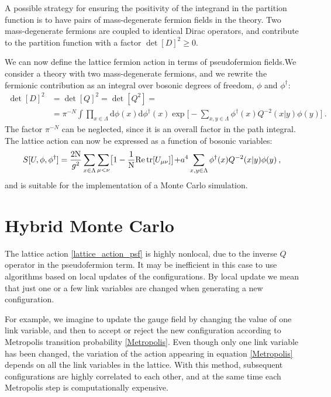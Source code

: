 A possible strategy for ensuring the positivity of the integrand in the partition function is to have pairs of mass-degenerate fermion fields in the theory. Two mass-degenerate fermions are coupled to identical Dirac operators, and contribute to the partition function with a factor $\det[D]^2 \geq 0$. 

We can now define the lattice fermion action in terms of pseudofermion fields.We consider a theory with two mass-degenerate fermions, and we rewrite the fermionic contribution as an integral over bosonic degrees of freedom, $\phi$ and $\phi^{\dagger}$:
\begin{equation}
\begin{split}
\det[D]^2 &= \det[Q]^2 = \det[Q^2] = \\
&=\pi^{-N} \int \prod_{x \in \Lambda} \mathrm{d} \phi(x) \mathrm{d} \phi^{\dagger}(x) \exp \biggl[ 
-\sum_{x,y \in \Lambda} \phi^{\dagger}(x) Q^{-2} (x \vert y) \phi(y) \biggr] \: .
\end{split}
\end{equation}
%
The factor $\pi^{-N}$ can be neglected, since it is an overall factor in the path integral. The lattice action can now be expressed as a function of bosonic variables:
\begin{equation}
S[U,\phi,\phi^{\dagger}] = \frac{2 \mathrm N}{g^2} \sum_{x \in \Lambda}  \sum_{\mu < \nu} \bigr[  1 - \frac{1}{\mathrm{N}} \mathrm{Re} \tr  [U_{\mu \nu}] \bigl ] +  a^4 \sum_{x,y \in \Lambda} \phi^{\dagger}(x) Q^{-2}(x \vert y)\phi(y) \: ,
\label{lattice_action_psf}
\end{equation}
%
and is suitable for the implementation of a Monte Carlo simulation.


\section{Hybrid Monte Carlo}

The lattice action \ref{lattice_action_psf} is highly nonlocal, due to the inverse $Q$ operator in the pseudofermion term. It may be inefficient in this case to use algorithms based on local updates  of the configurations. By local update we mean that just one or a few link variables are changed when generating a new configuration. 

For example, we imagine to update the gauge field by changing the value of one link variable, and then to accept or reject the new configuration according to Metropolis transition probability \ref{Metropolis}. Even though only one link variable has been changed, the variation of the action appearing in equation \ref{Metropolis} depends on all the link variables in the lattice. With this method, subsequent configurations are highly correlated to each other, and at the same time each Metropolis step is computationally expensive.

